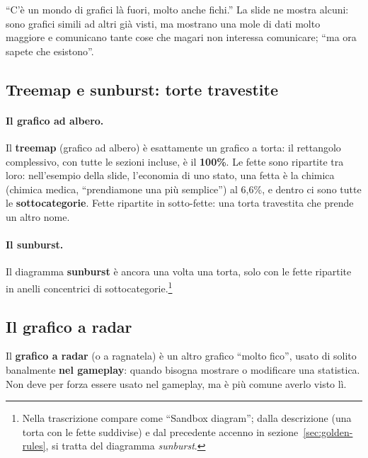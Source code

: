 ``C'è un mondo di grafici là fuori, molto anche fichi.'' La slide ne mostra
alcuni: sono grafici simili ad altri già visti, ma mostrano una mole di dati
molto maggiore e comunicano tante cose che magari non interessa comunicare;
``ma ora sapete che esistono''.

\subsection{Treemap e sunburst: torte travestite}

\paragraph{Il grafico ad albero.} Il \textbf{treemap} (grafico ad albero) è
esattamente un grafico a torta: il rettangolo complessivo, con tutte le sezioni
incluse, è il \textbf{100\%}. Le fette sono ripartite tra loro: nell'esempio
della slide, l'economia di uno stato, una fetta è la chimica (chimica
medica, ``prendiamone una più semplice'') al 6,6\%, e dentro ci sono tutte le
\textbf{sottocategorie}. Fette ripartite in sotto-fette: una torta travestita
che prende un altro nome.

\paragraph{Il sunburst.} Il diagramma \textbf{sunburst} è ancora una volta una
torta, solo con le fette ripartite in anelli concentrici di
sottocategorie.\footnote{Nella trascrizione compare come ``Sandbox
diagram''; dalla descrizione (una torta con le fette suddivise) e dal
precedente accenno in sezione~\ref{sec:golden-rules}, si tratta del
diagramma \emph{sunburst}.}

\subsection{Il grafico a radar}

Il \textbf{grafico a radar} (o a ragnatela) è un altro grafico ``molto fico'',
usato di solito banalmente \textbf{nel gameplay}: quando bisogna mostrare o
modificare una statistica. Non deve per forza essere usato nel gameplay, ma è
più comune averlo visto lì.


